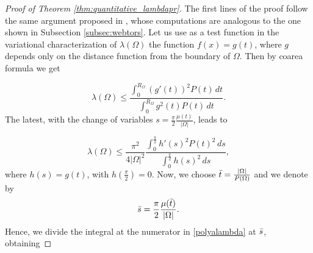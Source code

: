 \documentclass[oneside,a4paper,11pt,notitlepage]{article}
\newcommand{\abs}[1]{{\left|#1\right|}}
\theoremstyle{definition}
\theoremstyle{plain}
\theoremstyle{definition}
\begin{document}
\begin{proof}[Proof of Theorem \ref{thm:quantitative_lambdapr}]
 The first lines of the proof follow the same argument proposed in \cite{polya1960}, whose computations are analogous to the one shown in Subsection \ref{subsec:webtors}. Let us use as a test function in the variational characterization of $\lambda(\Omega)$ the function $f(x)=g(t)$, where $g$ depends only on the distance function from the boundary of $\Omega$. Then by coarea formula we get

\begin{equation}
\label{polyalambda}
    \lambda(\Omega) \leq \dfrac{\displaystyle{\int_0^{R_\Omega} (g'(t))^2 P(t) \, dt}}{\displaystyle{\int_0^{R_\Omega} g^2(t) P(t) \, dt}}.
\end{equation}
The latest, with the change of  variables $s= \frac{\pi}{2}\frac{\mu(t)}{\abs{\Omega}}$, leads to 

\begin{equation*}
    \lambda(\Omega)\le\frac{\pi^2}{4\abs{\Omega}^2}\frac{\displaystyle{\int_{0}^{\frac{\pi}{2}}h'(s)^2 P(t)^2\,ds}}{\displaystyle{\int_0^{\frac{\pi}{2}}h(s)^2\,ds}},
\end{equation*}
where $h(s)=g(t)$, with $h(\frac{\pi}{2})=0$. Now, we choose $\Bar{t}= \frac{\abs{\Omega}}{P(\Omega)}$ and we  denote by 
\begin{equation}\label{eq:bars}
    \Bar{s}= \frac{\pi}{2}\frac{\mu(\Bar{t})}{\abs{\Omega}}.
    \end{equation}
Hence, we divide the integral at the numerator in \eqref{polyalambda} at $\Bar{s}$, obtaining


\end{proof}
\end{document}
